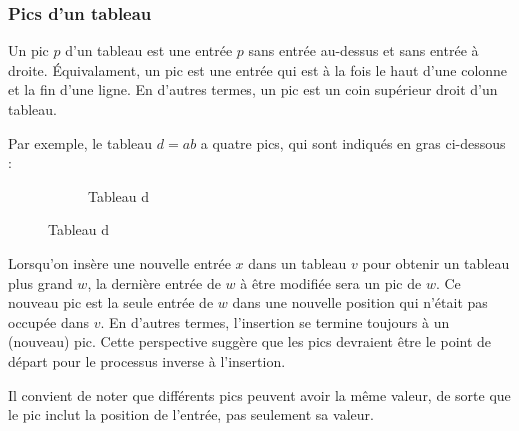 \subsubsection{Pics d'un tableau}
Un pic $p$ d'un tableau est une entrée $p$ sans entrée au-dessus et sans entrée à droite. 
Équivalament, un pic est une entrée qui est à la fois le haut d'une colonne et la fin d'une ligne.
En d'autres termes, un pic est un coin supérieur droit d'un tableau.

Par exemple, le tableau $d = ab$ a quatre pics, qui sont indiqués en gras ci-dessous :
\begin{figure}[!ht]
	\centering
	\begin{subfigure}[b]{0.4\linewidth}
		\centering
		\caption{Tableau d}
		\label{fig:tab14}
	\end{subfigure}
	\label{fig:tabs9}
\end{figure}
Lorsqu'on insère une nouvelle entrée $x$ dans un tableau $v$ pour obtenir un tableau plus grand $w$, la dernière entrée de $w$ à être modifiée sera un pic de $w$. Ce nouveau pic est la seule entrée de $w$ dans une nouvelle position qui n'était pas occupée dans $v$. En d'autres termes, l'insertion se termine toujours à un (nouveau) pic. Cette perspective suggère que les pics devraient être le point de départ pour le processus inverse à l'insertion.

Il convient de noter que différents pics peuvent avoir la même valeur, de sorte que le pic inclut la position de l'entrée, pas seulement sa valeur.

